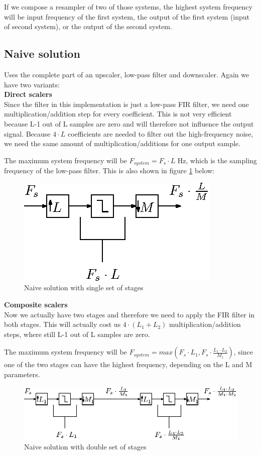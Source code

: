 \documentclass[a4paper,twoside,11pt, fleqn]{article}
\begin{document}
\smallskip
If we compose a resampler of two of those systems, the highest system frequency will be input frequency of the first system, the output of the first system (input of second system), or the output of the second system.

\subsection{Naive solution}
Uses the complete part of an upscaler, low-pass filter and downscaler. Again we have two variants:\\

\textbf{Direct scalers}\\
Since the filter in this implementation is just a low-pass FIR filter, we need one multiplication/addition step for every coefficient. This is not very efficient because L-1 out of L samples are zero and will therefore not influence the output signal. Because $4\cdot L$ coefficients are needed to filter out the high-frequency noise, we need the same amount of multiplication/additions for one output sample.

\smallskip
The maximum system frequency will be $F_{system} = F_s\cdot L$ Hz, which is the sampling frequency of the low-pass filter. This is also shown in figure \ref{fig:naive} below:
\begin{figure}[h]
	\includegraphics[scale = 1]{Images/3_0}
    \caption{Naive solution with single set of stages}
    \label{fig:naive}
\end{figure}

\textbf{Composite scalers } \\
Now we actually have two stages and therefore we need to apply the FIR filter in both stages. This will actually cost us $4\cdot (L_1 + L_2)$ multiplication/addition steps, where still L-1 out of L samples are zero.

\smallskip
The maximum system frequency will be $F_{system} = max(F_s\cdot L_1, F_s\cdot \frac{L_1\cdot L_2}{M_1})$, since one of the two stages can have the highest frequency, depending on the L and M parameters.
\begin{figure}[h]
	\includegraphics[scale = 1]{Images/3_1}
    \caption{Naive solution with double set of stages}
\end{figure}
\end{document}
